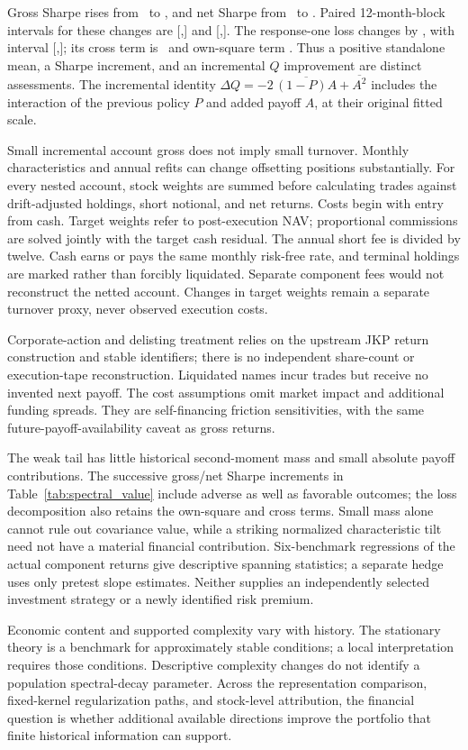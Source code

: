 Gross Sharpe rises from \LeadingSR\ to \TwoGroupSR, and net Sharpe from
\LeadingNetSR\ to \TwoGroupNetSR. Paired 12-month-block intervals for these
changes are [\GroupGrossLow,\GroupGrossHigh] and
[\GroupNetLow,\GroupNetHigh]. The response-one loss changes by \IntermediateQDelta,
with interval [\IntermediateQLow,\IntermediateQHigh]; its cross term is
\IntermediateQCross\ and own-square term \IntermediateQSquare. Thus a positive
standalone mean, a Sharpe increment, and an incremental $Q$ improvement are
distinct assessments. The incremental identity
$\Delta Q=-2\,\overline{(1-P)A}+\overline{A^2}$ includes the interaction of
the previous policy $P$ and added payoff $A$, at their original fitted scale.

Small incremental account gross does not imply small turnover. Monthly
characteristics and annual refits can change offsetting positions substantially.
For every nested account, stock weights are summed before calculating trades
against drift-adjusted holdings, short notional, and net returns. Costs begin
with entry from cash. Target weights refer to post-execution NAV; proportional
commissions are solved jointly with the target cash residual. The annual
short fee is divided by twelve. Cash earns or pays the same monthly risk-free
rate, and terminal holdings are marked rather than forcibly liquidated.
Separate component fees would not reconstruct the netted account. Changes in
target weights remain a separate turnover proxy, never observed execution costs.

Corporate-action and delisting treatment relies on the upstream JKP return
construction and stable identifiers; there is no independent share-count or
execution-tape reconstruction. Liquidated names incur trades but receive no
invented next payoff. The cost assumptions omit market impact and additional
funding spreads. They are self-financing friction sensitivities, with the
same future-payoff-availability caveat as gross returns.

The weak tail has little historical second-moment mass and small absolute
payoff contributions. The successive gross/net Sharpe increments in
Table~\ref{tab:spectral_value} include adverse as well as favorable outcomes;
the loss decomposition also retains the own-square and cross terms. Small
mass alone cannot rule out covariance value, while a striking normalized
characteristic tilt need not have a material financial contribution.
Six-benchmark regressions of the actual component returns give descriptive
spanning statistics; a separate hedge uses only pretest slope estimates.
Neither supplies an independently selected investment strategy or a newly
identified risk premium.

Economic content and supported complexity vary with history. The stationary
theory is a benchmark for approximately stable conditions; a local
interpretation requires those conditions. Descriptive complexity changes do
not identify a population spectral-decay parameter. Across the representation
comparison, fixed-kernel regularization paths, and stock-level attribution,
the financial question is whether additional available directions improve
the portfolio that finite historical information can support.
